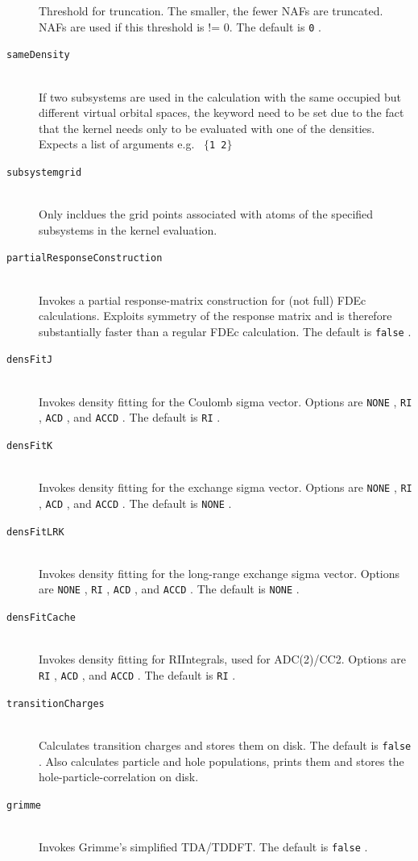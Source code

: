 \documentclass[bibliography=totocnumbered,a4paper,10pt,oneside]{scrbook}
\newcommand{\ttt}[1]{%
  \begingroup\setlength{\fboxsep}{1pt}%
  \colorbox{serenity-green!30}{\texttt{\hspace*{2pt}\vphantom{(g}#1\hspace*{2pt}}}%
  \endgroup
}
\begin{document}
\begin{description}
    Threshold for truncation. The smaller, the fewer NAFs are truncated. NAFs are used if this 
    threshold is != 0. The default is \ttt{0}.
    \item[\texttt{sameDensity}]\hfill\\
    If two subsystems are used in the calculation with the same occupied but different virtual orbital spaces, the keyword need to be set due to the fact that the kernel needs only to be evaluated with one of the densities. Expects a list of arguments e.g.~\ttt{$\{$1 2$\}$}
    \item[\texttt{subsystemgrid}]\hfill\\
    Only incldues the grid points associated with atoms of the specified subsystems in the kernel evaluation.
    \item[\texttt{partialResponseConstruction}]\hfill\\
    Invokes a partial response-matrix construction for (not full) FDEc calculations.
    Exploits symmetry of the response matrix and is therefore substantially faster than
    a regular FDEc calculation.
    The default is \ttt{false}.
    \item[\texttt{densFitJ}]\hfill\\
    Invokes density fitting for the Coulomb sigma vector. 
    Options are \ttt{NONE}, \ttt{RI}, \ttt{ACD}, and \ttt{ACCD}. The default is \ttt{RI}.
    \item[\texttt{densFitK}]\hfill\\
    Invokes density fitting for the exchange sigma vector. 
    Options are \ttt{NONE}, \ttt{RI}, \ttt{ACD}, and \ttt{ACCD}. The default is \ttt{NONE}.
    \item[\texttt{densFitLRK}]\hfill\\
    Invokes density fitting for the long-range exchange sigma vector. 
    Options are \ttt{NONE}, \ttt{RI}, \ttt{ACD}, and \ttt{ACCD}. The default is \ttt{NONE}.
    \item[\texttt{densFitCache}]\hfill\\
    Invokes density fitting for RIIntegrals, used for ADC(2)/CC2. 
    Options are \ttt{RI}, \ttt{ACD}, and \ttt{ACCD}. The default is \ttt{RI}.
    \item[\texttt{transitionCharges}]\hfill\\
    Calculates transition charges and stores them on disk. The default is \ttt{false}. Also calculates particle and hole populations, prints them and stores the hole-particle-correlation on disk.
    \item[\texttt{grimme}]\hfill\\
    Invokes Grimme's simplified TDA/TDDFT. The default is \ttt{false}.
\end{description}
\end{document}
